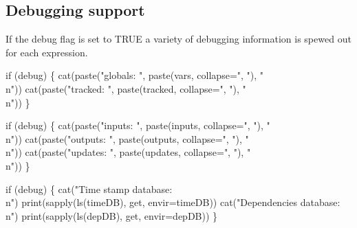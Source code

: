 \documentclass[a4paper]{article}%
\begin{document}
\subsection{Debugging support} 
\label{sec:debugging}

If the {\Tt{}debug\nwendquote} flag is set to {\Tt{}TRUE\nwendquote} a variety of 
debugging information is spewed out for each expression.

\nwenddocs{}\endmoddef\nwstartdeflinemarkup{}\nwenddeflinemarkup
if (debug) \{
    cat(paste("globals: ", paste(vars, collapse=", "), "\\n"))
    cat(paste("tracked: ", paste(tracked, collapse=", "), "\\n"))
\}
\nwendcode{}\nwdocspar

\nwenddocs{}\endmoddef\nwstartdeflinemarkup{}\nwenddeflinemarkup
if (debug) \{
    cat(paste("inputs: ", paste(inputs, collapse=", "), "\\n"))
    cat(paste("outputs: ", paste(outputs, collapse=", "), "\\n"))
    cat(paste("updates: ", paste(updates, collapse=", "), "\\n"))
\}
\nwendcode{}\nwdocspar

\nwenddocs{}\endmoddef\nwstartdeflinemarkup{}\nwenddeflinemarkup
if (debug) \{
    cat("Time stamp database:\\n")
    print(sapply(ls(timeDB), get, envir=timeDB))
    cat("Dependencies database:\\n")
    print(sapply(ls(depDB), get, envir=depDB))
\}
\nwendcode{}\nwdocspar
\end{document}
